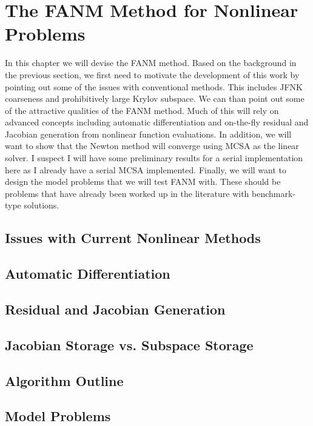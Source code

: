 \chapter{The FANM Method for Nonlinear Problems}
\label{ch:fanm}

In this chapter we will devise the FANM method. Based on the
background in the previous section, we first need to motivate the
development of this work by pointing out some of the issues with
conventional methods. This includes JFNK coarseness and prohibitively
large Krylov subspace. We can than point out some of the attractive
qualities of the FANM method. Much of this will rely on advanced
concepts including automatic differentiation and on-the-fly residual
and Jacobian generation from nonlinear function evaluations. In
addition, we will want to show that the Newton method will converge
using MCSA as the linear solver. I suspect I will have some
preliminary results for a serial implementation here as I already have
a serial MCSA implemented. Finally, we will want to design the model
problems that we will test FANM with. These should be problems that
have already been worked up in the literature with benchmark-type
solutions.

\section{Issues with Current Nonlinear Methods}
\label{sec:nonlinear_issues}

\section{Automatic Differentiation}
\label{sec:automatic_differentiation}

\section{Residual and Jacobian Generation}
\label{sec:fanm_generation}

\section{Jacobian Storage vs. Subspace Storage}
\label{sec:fanm_storage}

\section{Algorithm Outline}
\label{sec:fanm_algorithm_outline}

\section{Model Problems}
\label{sec:fanm_model_problems}
